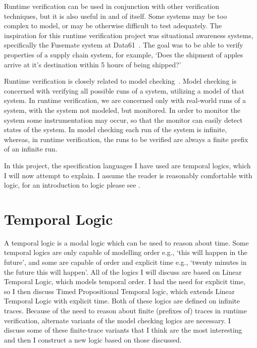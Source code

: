 \documentclass[a4paper]{article}
\begin{document}
Runtime verification can be used in conjunction with other verification techniques, but it is also useful in and of itself. Some systems may be too complex to model, or may be otherwise difficult to test adequately. The inspiration for this runtime verification project was situational awareness systems, specifically the Fusemate system at Data61~\autocite{Baumgartner:Haslum:situational-awareness-industrial-operations:ASOR:2018}. The goal was to be able to verify properties of a supply chain system, for example, `Does the shipment of apples arrive at it's destination within 5 hours of being shipped?'

Runtime verification is closely related to model checking~\autocite{baier2008principles}. Model checking is concerned with verifying all possible runs of a system, utilizing a model of that system. In runtime verification, we are concerned only with real-world runs of a system, with the system not modeled, but monitored. In order to monitor the system some instrumentation may occur, so that the monitor can easily detect states of the system. In model checking each run of the system is infinite, whereas, in runtime verification, the runs to be verified are always a finite prefix of an infinite run.

In this project, the specification languages I have used are temporal logics, which I will now attempt to explain. I assume the reader is reasonably comfortable with logic, for an introduction to logic please see \textcite{bradley2007calculus}.

\section{Temporal Logic}

A temporal logic is a modal logic which can be used to reason about time. Some temporal logics are only capable of modelling order e.g., `this will happen in the future', and some are capable of order and explicit time e.g., `twenty minutes in the future this will happen'. All of the logics I will discuss are based on Linear Temporal Logic, which models temporal order. I had the need for explicit time, so I then discuss Timed Propositional Temporal logic, which extends Linear Temporal Logic with explicit time. Both of these logics are defined on infinite traces. Because of the need to reason about finite (prefixes of) traces in runtime verification, alternate variants of the model checking logics are necessary. I discuss some of these finite-trace variants that I think are the most interesting and then I construct a new logic based on those discussed.
\end{document}
